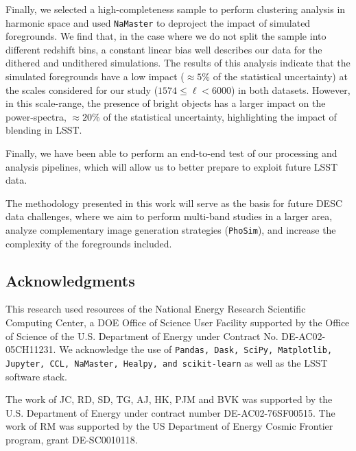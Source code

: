 \documentclass[twocolumn]{aastex62}
\begin{document}
Finally, we selected a high-completeness sample to perform clustering analysis in harmonic space and used \texttt{NaMaster} to deproject the impact of simulated foregrounds. We find that, in the case where we do not split the sample into different redshift bins, a constant linear bias well describes our data for the dithered and undithered simulations. The results of this analysis indicate that the simulated foregrounds have a low impact ($\approx 5\%$ of the statistical uncertainty) at the scales considered for our study ($1574 \leq \ell < 6000$) in both datasets. However, in this scale-range, the presence of bright objects has a larger impact on the power-spectra, $\approx 20\%$ of the statistical uncertainty, highlighting the impact of blending in LSST. 

Finally, we have been able to perform an end-to-end test of our processing and analysis pipelines, which will allow us to better prepare to exploit future LSST data.

The methodology presented in this work will serve as the basis for future DESC data challenges, where we aim to perform multi-band studies in a larger area, analyze complementary image generation strategies (\texttt{PhoSim}), and increase the complexity of the foregrounds included.


\subsection*{Acknowledgments}

This research used resources of the National Energy Research Scientific Computing Center, a DOE Office of Science User Facility supported by the Office of Science of the U.S. Department of Energy under Contract No. DE-AC02-05CH11231. We acknowledge the use of \texttt{Pandas, Dask, SciPy, Matplotlib, Jupyter, CCL, NaMaster, Healpy, and scikit-learn} as well as the LSST software stack.

The work of JC, RD, SD, TG, AJ, HK, PJM and BVK was supported by the U.S. Department of Energy under contract number DE-AC02-76SF00515. 
The work of RM was supported by the US Department of Energy Cosmic Frontier program, grant DE-SC0010118.




\end{document}
